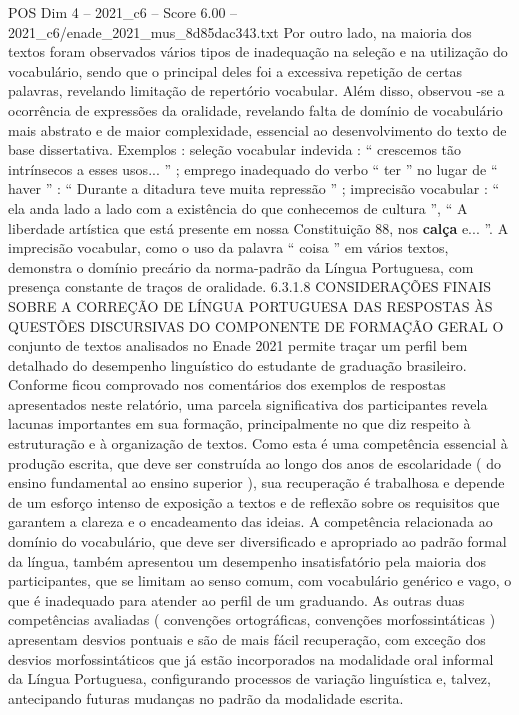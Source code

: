 \begin{textsample}{POS Dim 4 – 2021\_c6 – Score 6.00 – 2021\_c6/enade\_2021\_mus\_8d85dac343.txt}
Por outro lado, na maioria dos textos foram observados vários tipos de inadequação na seleção e na utilização do vocabulário, sendo que o principal deles foi a excessiva repetição de certas palavras, revelando limitação de repertório vocabular.
Além disso, observou -se a ocorrência de expressões da oralidade, revelando falta de domínio de vocabulário mais abstrato e de maior complexidade, essencial ao desenvolvimento do texto de base dissertativa.
Exemplos : seleção vocabular indevida : “ crescemos tão intrínsecos a esses usos... ” ; emprego inadequado do verbo “ ter ” no lugar de “ haver ” : “ Durante a ditadura teve muita repressão ” ; imprecisão vocabular : “ ela anda lado a lado com a existência do que conhecemos de cultura ”, “ A liberdade artística que está presente em nossa Constituição 88, nos \textbf{calça} e... ”.
A imprecisão vocabular, como o uso da palavra “ coisa ” em vários textos, demonstra o domínio precário da norma-padrão da Língua Portuguesa, com presença constante de traços de oralidade. 6.3.1.8 CONSIDERAÇÕES FINAIS SOBRE A CORREÇÃO DE LÍNGUA PORTUGUESA DAS RESPOSTAS ÀS QUESTÕES DISCURSIVAS DO COMPONENTE DE FORMAÇÃO GERAL O conjunto de textos analisados no Enade 2021 permite traçar um perfil bem detalhado do desempenho linguístico do estudante de graduação brasileiro.
Conforme ficou comprovado nos comentários dos exemplos de respostas apresentados neste relatório, uma parcela significativa dos participantes revela lacunas importantes em sua formação, principalmente no que diz respeito à estruturação e à organização de textos.
Como esta é uma competência essencial à produção escrita, que deve ser construída ao longo dos anos de escolaridade ( do ensino fundamental ao ensino superior ), sua recuperação é trabalhosa e depende de um esforço intenso de exposição a textos e de reflexão sobre os requisitos que garantem a clareza e o encadeamento das ideias.
A competência relacionada ao domínio do vocabulário, que deve ser diversificado e apropriado ao padrão formal da língua, também apresentou um desempenho insatisfatório pela maioria dos participantes, que se limitam ao senso comum, com vocabulário genérico e vago, o que é inadequado para atender ao perfil de um graduando.
As outras duas competências avaliadas ( convenções ortográficas, convenções morfossintáticas ) apresentam desvios pontuais e são de mais fácil recuperação, com exceção dos desvios morfossintáticos que já estão incorporados na modalidade oral informal da Língua Portuguesa, configurando processos de variação linguística e, talvez, antecipando futuras mudanças no padrão da modalidade escrita.

\end{textsample}
